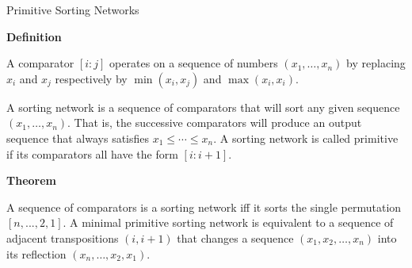\documentclass[10pt, compress,aspectratio=169,handout]{beamer}
\begin{document}
\begin{frame}{Primitive Sorting Networks}\pause

\vspace{1em}

\begin{block}{\textbf{Definition}}

\vspace{-.5em}

A \alert{comparator} $[i : j]$ operates on a sequence of numbers $(x_1,\ldots, x_n)$ by replacing $x_i$ and $x_j$ respectively by $\min(x_i, x_j)$ and $\max(x_i, x_i)$. 

\pause

A \alert{sorting network} is a sequence of comparators that will sort any given sequence $(x_1,\ldots,x_n)$. That is, the successive comparators will produce an output sequence that always satisfies $x_1\leq\cdots \leq x_n$. A sorting network is called \alert{primitive} if its comparators all have the form $[i : i + 1]$.
\end{block}

\pause

\begin{block}{\textbf{Theorem}}

\vspace{-.5em}

A sequence of comparators is a sorting network iff it sorts the single permutation $[n,..., 2, 1]$.  A minimal primitive sorting network is equivalent to a sequence of adjacent transpositions $(i,i + 1)$ that changes a sequence $(x_1, x_2,\ldots ,x_n)$ into its reflection $(x_n,\ldots, x_2, x_1)$.

\end{block}

\end{frame}

\end{document}
